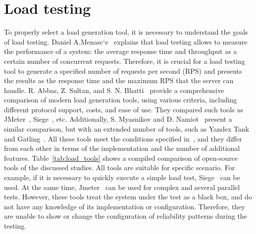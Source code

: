 \section{Load testing}\label{sec:load_generation}
To properly select a load generation tool, it is necessary to understand the goals of load testing. Daniel A.Menasc`e~\cite{load_testing_base} explains that load testing allows to measure the performance of a system: the average response time and throughput as a certain number of concurrent requests. Therefore, it is crucial for a load testing tool to generate a specified number of requests per second (RPS) and presents the results as the response time and the maximum RPS that the server can handle.
R. Abbas, Z. Sultan, and S. N. Bhatti~\cite{load_testing_tools} provide a comprehensive comparison of modern load generation tools, using various criteria, including different protocol support, costs, and ease of use. They compared such tools as JMeter~\cite{jmeter}, Siege~\cite{siege}, etc. Additionally, S. Myasnikov and D. Namiot~\cite{load_testing_tools_rus} present a similar comparison, but with an extended number of tools, such as Yandex Tank~\cite{yandex_tank} and Gatling~\cite{gatling}. All these tools meet the conditions specified in~\cite{load_testing_base}, and they differ from each other in terms of the implementation and the number of additional features. Table~\ref{tab:load_tools} shows a compiled comparison of open-source tools of the discussed studies.
All tools are suitable for specific scenario. For example, if it is necessary to quickly execute a simple load test, Siege~\cite{siege} can be used. At the same time, Jmeter~\cite{jmeter} can be used for complex and several parallel tests. However, these tools treat the system under the test as a black box, and do not have any knowledge of its implementation or configuration. Therefore, they are unable to show or change the configuration of reliability patterns during the testing.


